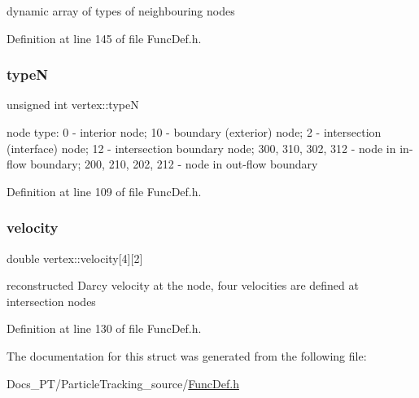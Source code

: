 dynamic array of types of neighbouring nodes 

Definition at line 145 of file Func\+Def.\+h.

\mbox{\label{structvertex_aa8c5c50393696a507d20dda8ec69fd51}} 
\subsubsection{\texorpdfstring{typeN}{typeN}}
{\footnotesize\ttfamily unsigned int vertex\+::typeN}

node type\+: 0 -\/ interior node; 10 -\/ boundary (exterior) node; 2 -\/ intersection (interface) node; 12 -\/ intersection boundary node; 300, 310, 302, 312 -\/ node in in-\/flow boundary; 200, 210, 202, 212 -\/ node in out-\/flow boundary 

Definition at line 109 of file Func\+Def.\+h.

\mbox{\label{structvertex_a92493253fc12b459eb0599ec07c56743}} 
\subsubsection{\texorpdfstring{velocity}{velocity}}
{\footnotesize\ttfamily double vertex\+::velocity\mbox{[}4\mbox{]}\mbox{[}2\mbox{]}}

reconstructed Darcy velocity at the node, four velocities are defined at intersection nodes 

Definition at line 130 of file Func\+Def.\+h.



The documentation for this struct was generated from the following file\+:\begin{DoxyCompactItemize}
\item 
Docs\+\_\+\+P\+T/\+Particle\+Tracking\+\_\+source/\mbox{\hyperlink{_func_def_8h}{Func\+Def.\+h}}\end{DoxyCompactItemize}
